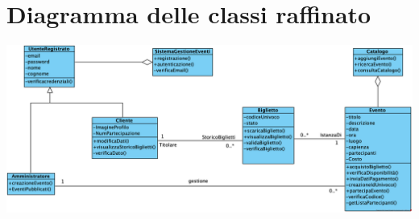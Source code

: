 \section{Diagramma delle classi raffinato}
\begin{center}	
	\vspace{1ex}
	\includegraphics[height=0.38\linewidth]{assets/casid'uso/DiagrammaDelleClassiRaffinato.png}
	\vspace{1ex}
\end{center}



